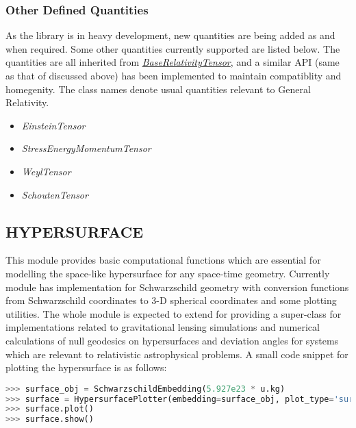 \documentclass{aastex63}
\begin{document}
\subsubsection{Other Defined Quantities}\label{subsubsec:other}

As the library is in heavy development, new quantities are being added as and when required. Some other quantities currently supported are listed below. The quantities are all inherited from \hyperref[subsec:BaseRelativityTensor]{\textit{BaseRelativityTensor}}, and a similar API (same as that of discussed above) has been implemented to maintain compatiblity and homegenity. The class names denote usual quantities relevant to General Relativity.

\begin{itemize}
\item \textit{EinsteinTensor}
\item \textit{StressEnergyMomentumTensor}
\item \textit{WeylTensor}
\item \textit{SchoutenTensor}
\end{itemize}






\subsection{HYPERSURFACE}
This module provides basic computational functions which are essential for modelling the space-like hypersurface for any space-time geometry. Currently module has implementation for Schwarzschild geometry with conversion functions from Schwarzschild coordinates to 3-D spherical coordinates and some plotting utilities. The whole module is expected to extend for providing a super-class for implementations related to gravitational lensing simulations and numerical calculations of null geodesics on hypersurfaces and deviation angles for systems which are relevant to relativistic astrophysical problems. A small code snippet for plotting the hypersurface is as follows:
\begin{lstlisting}[language=Python, caption=Schwarzschild Embedding]
>>> surface_obj = SchwarzschildEmbedding(5.927e23 * u.kg)
>>> surface = HypersurfacePlotter(embedding=surface_obj, plot_type='surface')
>>> surface.plot()
>>> surface.show()
\end{lstlisting}
\end{document}
